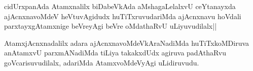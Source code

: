 \begin{artha}
cidUrxpanAda Atamxnalilx biDabeVkAda aMshagaLelalxvU ceYtanayxda ajAcnxnavoMdeV heVtuvAgidudx huTiTxruvudariMda ajAcnxnavu hoVdali parxtayxgAtamxnige beVreyAgi beVre oMdathaRvU uLiyuvudilalx||
\end{artha}


\begin{artha}
AtamxjAcnxnadalilx adara ajAcnxnavoMdeVkAraNadiMda huTiTxkoMDiruva anAtamxvU parxmANadiMda tiLiya takakxdUdx agiruva padAthaRvu goVcarisuvudilalx, adariMda AtamxvoMdeVyAgi uLidiruvudu.
\end{artha}
